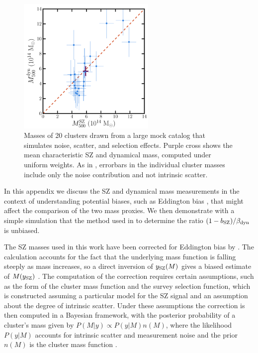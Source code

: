 \begin{figure}
\begin{minipage}[b]{2.6in}
 \centerline{\includegraphics[width=2.6in]{chapter3/figure_a2.pdf}}
\end{minipage}
\begin{minipage}[b]{2.2in}
\caption{Masses of 20 clusters drawn from a large mock catalog that simulates noise, scatter, and 
selection effects. Purple cross shows the mean characteristic SZ and dynamical mass, computed under 
uniform weights. As in , errorbars in the individual cluster masses include only the 
noise contribution and not intrinsic scatter.}
\label{f:appendix_a2}
\end{minipage}
\end{figure}


In this appendix we discuss the SZ and dynamical mass measurements in the context of understanding potential biases, such as Eddington bias \citep{eddington13}, that might affect the comparison of the two mass proxies. We then demonstrate with a simple simulation that the method used in  to determine the ratio $(1-b_{\rm SZ})/\beta_{\rm dyn}$ is unbiased.

The SZ masses used in this work have been corrected for Eddington bias by \cite{hasselfield13}. The calculation accounts for the fact that
the underlying mass function is falling steeply as mass increases, so a direct inversion of $y_{\rm SZ}(M)$ gives a biased estimate of $M(y_{\rm SZ})$ \citep{evrard14}. The computation of the correction requires certain assumptions, such as the form of the cluster mass function and the survey selection function, which is constructed assuming a particular model for the SZ signal and an assumption about the degree of intrinsic scatter. Under these assumptions the correction is then computed in a Bayesian framework, with the posterior probability of a cluster's mass given by $P(M \vert y) \propto P(y \vert M) n(M)$, where the likelihood $P(y \vert M)$ accounts for intrinsic scatter and measurement noise and the prior $n(M)$ is the cluster mass function
\citep[see section 3.2 of][]{hasselfield13}.

